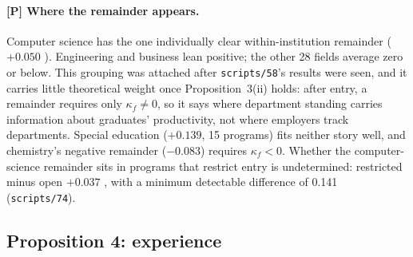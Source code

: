 \paragraph{[P] Where the remainder appears.} Computer science has the one individually clear within-institution
remainder ($+0.050$ ). Engineering and business lean positive; the other 28 fields average zero
or below. This grouping was attached after \texttt{scripts/58}'s results were seen, and it carries little
theoretical weight once Proposition~3(ii) holds: after entry, a remainder requires only $\kappa_f\neq0$, so it says
where department standing carries information about graduates' productivity, not where employers track
departments. Special education ($+0.139$, 15 programs) fits neither story well, and chemistry's negative remainder
($-0.083$) requires $\kappa_f<0$. Whether the computer-science remainder sits in programs that restrict entry is
undetermined: restricted minus open $+0.037$ , with a minimum detectable difference of 0.141
(\texttt{scripts/74}).

\subsection{Proposition 4: experience}\label{si:theory:experience}

